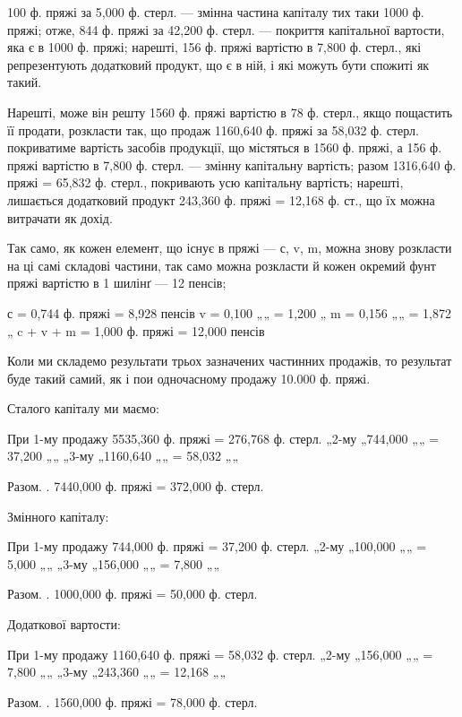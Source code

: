 100 ф. пряжі за 5,000 ф. стерл. — змінна частина капіталу тих таки
1000 ф. пряжі; отже, 844 ф. пряжі за 42,200 ф. стерл. — покриття
капітальної вартости, яка є в 1000 ф. пряжі; нарешті, 156 ф. пряжі
вартістю в 7,800 ф. стерл., які репрезентують додатковий продукт, що
є в ній, і які можуть бути спожиті як такий.

Нарешті, може він решту 1560 ф. пряжі вартістю в 78 ф. стерл.,
якщо пощастить її продати, розкласти так, що продаж 1160,640 ф.
пряжі за 58,032 ф. стерл. покриватиме вартість засобів продукції, що
містяться в 1560 ф. пряжі, а 156 ф. пряжі вартістю в 7,800 ф. стерл. —
змінну капітальну вартість; разом 1316,640 ф. пряжі = 65,832 ф. стерл.,
покривають усю капітальну вартість; нарешті, лишається додатковий
продукт 243,360 ф. пряжі = 12,168 ф. ст., що їх можна витрачати як
дохід.

Так само, як кожен елемент, що існує в пряжі — с, v, m, можна
знову розкласти на ці самі складові частини, так само можна розкласти й
кожен окремий фунт пряжі вартістю в 1 шилінґ — 12 пенсів;

с = 0,744 ф. пряжі = 8,928 пенсів
v = 0,100 „„ = 1,200 „
m = 0,156 „„ = 1,872 „
c + v + m = 1,000 ф. пряжі = 12,000 пенсів

Коли ми складемо результати трьох зазначених частинних продажів, то
результат буде такий самий, як і пои одночасному продажу 10.000 ф.
пряжі.

Сталого капіталу ми маємо:

При 1-му продажу 5535,360 ф. пряжі = 276,768 ф. стерл.
  „2-му „744,000 „„ = 37,200 „„
  „3-му „1160,640 „„ = 58,032 „„

                  Разом.  . 7440,000 ф. пряжі = 372,000    ф. стерл.

Змінного капіталу:

При 1-му продажу 744,000 ф. пряжі = 37,200 ф. стерл.
  „2-му „100,000 „„ = 5,000 „„
  „3-му „156,000 „„ = 7,800 „„

                Разом.  . 1000,000 ф. пряжі = 50,000 ф. стерл.

Додаткової вартости:

При 1-му продажу 1160,640 ф. пряжі = 58,032    ф. стерл.
  „2-му „156,000 „„ = 7,800 „„
  „3-му „243,360 „„ = 12,168 „„

                  Разом.  . 1560,000 ф. пряжі = 78,000 ф. стерл.
